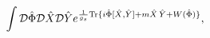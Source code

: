 \begin{equation}
\int {\cal D} \hat\Phi {\cal D} \hat X {\cal D} \hat Y e^{ \frac{1}{g_s} 
{\rm Tr} \{
i \hat\Phi [\hat X, \hat Y] + m \hat X \, \hat Y + W(\hat\Phi)\}},
\label{path}
\end{equation}

